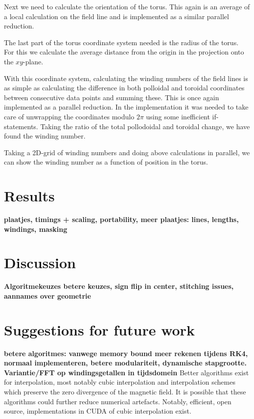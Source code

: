 \documentclass{article}
\begin{document}
Next we need to calculate the orientation of the torus. This again is an average of a local calculation on the field line and is implemented as a similar parallel reduction.

The last part of the torus coordinate system needed is the radius of the torus. For this we calculate the average distance from the origin in the projection onto the $xy$-plane. %

With this coordinate system, calculating the winding numbers of the field lines is as simple as calculating the difference in both polloidal and toroidal coordinates between consecutive data points and summing these. This is once again implemented as a parallel reduction. In the implementation it was needed to take care of unwrapping the coordinates modulo $2\pi$ using some inefficient if-statements. %
Taking the ratio of the total pollodoidal and toroidal change, we have found the winding number.

Taking a 2D-grid of winding numbers and doing above calculations in parallel, we can show the winding number as a function of position in the torus.
\section{Results}
{\bf plaatjes, timings + scaling, portability, meer plaatjes: lines, lengths, windings, masking}
\section{Discussion}
{\bf Algoritmekeuzes \textrightarrow betere keuzes, sign flip in center, stitching issues, aannames over geometrie}
\section{Suggestions for future work}
{\bf betere algoritmes: vanwege memory bound meer rekenen tijdens RK4, normaal implementeren, betere modulariteit, dynamische stapgrootte. Variantie/FFT op windingsgetallen in tijdsdomein}
Better algorithms exist for interpolation, most notably cubic interpolation and interpolation schemes which preserve the zero divergence of the magnetic field\cite{McNally01052011}. It is possible that these algorithms could further reduce numerical artefacts. %
Notably, efficient, open source, implementations in CUDA of cubic interpolation exist.\cite{Ruijters01012012}


\end{document}
